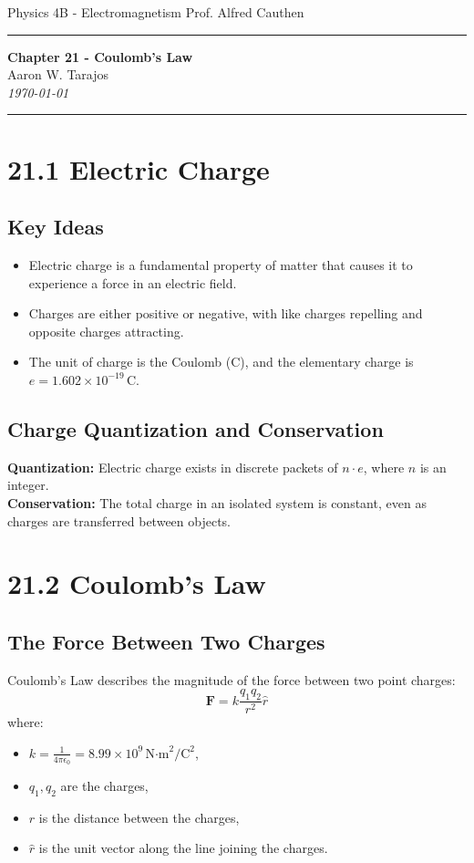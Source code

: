 \documentclass{article}
\begin{document}
\noindent
Physics 4B - Electromagnetism \hfill Prof. Alfred Cauthen

\noindent\rule{\textwidth}{0.4pt}

\begin{center}
    \textbf{\LARGE Chapter 21 - Coulomb's Law} \\
    \vspace{12pt}
    \large Aaron W. Tarajos \\
    \textit{\today}
\end{center}

\noindent\rule{\textwidth}{0.4pt}

\section*{21.1 Electric Charge}
\subsection*{Key Ideas}
\begin{itemize}
    \item Electric charge is a fundamental property of matter that causes it to experience a force in an electric field.
    \item Charges are either positive or negative, with like charges repelling and opposite charges attracting.
    \item The unit of charge is the Coulomb (C), and the elementary charge is \( e = 1.602 \times 10^{-19} \, \text{C} \).
\end{itemize}

\subsection*{Charge Quantization and Conservation}
\textbf{Quantization:} Electric charge exists in discrete packets of \( n \cdot e \), where \( n \) is an integer.\\
\textbf{Conservation:} The total charge in an isolated system is constant, even as charges are transferred between objects.

\section*{21.2 Coulomb's Law}
\subsection*{The Force Between Two Charges}
Coulomb's Law describes the magnitude of the force between two point charges:
\[
\mathbf{F} = k \frac{q_1 q_2}{r^2} \hat{r}
\]
where:
\begin{itemize}
    \item \( k = \frac{1}{4\pi \epsilon_0} = 8.99 \times 10^9 \, \text{N·m}^2/\text{C}^2 \),
    \item \( q_1, q_2 \) are the charges,
    \item \( r \) is the distance between the charges,
    \item \( \hat{r} \) is the unit vector along the line joining the charges.
\end{itemize}
\end{document}
